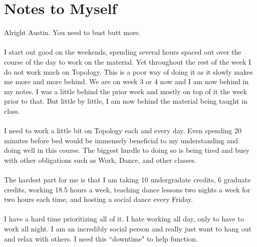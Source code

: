 \documentclass[10pt]{article}
\begin{document}
\section{Notes to Myself}
Alright Austin. You need to bust butt more.\\
\\
I start out good on the weekends, spending several hours spaced out over the course of the day to work on the material. Yet throughout the rest of the week I do not work much on Topology. This is a poor way of doing it as it slowly makes me more and more behind. We are on week 3 or 4 now and I am now behind in my notes. I was a little behind the prior week and mostly on top of it the week prior to that. But little by little, I am now behind the material being taught in class.\\
\\
I need to work a little bit on Topology each and every day. Even spending 20 minutes before bed would be immensely beneficial to my understanding and doing well in this course. The biggest hurdle to doing so is being tired and busy with other obligations such as Work, Dance, and other classes. \\
\\
The hardest part for me is that I am taking 10 undergradate credits, 6 graduate credits, working 18.5 hours a week, teaching dance lessons two nights a week for two hours each time, and hosting a social dance every Friday.\\
\\
I have a hard time prioritizing all of it. I hate working all day, only to have to work all night. I am an incredibly social person and really just want to hang out and relax with others. I need this ``downtime" to help function.
\end{document}
